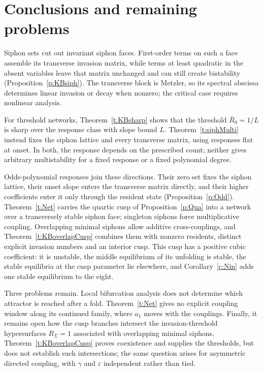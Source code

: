 \section{Conclusions and remaining problems}\label{s:concShort}

Siphon sets cut out invariant siphon faces. First-order terms on such a face
assemble its transverse invasion matrix, while terms at least quadratic in the
absent variables leave that matrix unchanged and can still create bistability
(Proposition~\ref{p:KBsiph}). The transverse block is Metzler, so its spectral
abscissa determines linear invasion or decay when nonzero; the critical case
requires nonlinear analysis.

For threshold networks, Theorem~\ref{t:KBsharp} shows that the threshold $\bar R_0=1/L$ is
sharp over the response class with slope bound $L$.
Theorem~\ref{t:siphMulti} instead fixes the siphon lattice and every transverse
matrix, using responses flat at onset. In both, the response depends on the
prescribed count; neither gives arbitrary multistability for a fixed response or
a fixed polynomial degree.

Odds-polynomial responses join these directions. Their zero set fixes the siphon
lattice, their onset slope enters the transverse matrix directly, and their higher
coefficients enter it only through the resident state (Proposition~\ref{p:Odd}).
Theorem~\ref{t:Net} carries the quartic cusp of Proposition~\ref{p:Qua} into a
network over a transversely stable siphon face; singleton siphons force
multiplicative coupling. Overlapping minimal siphons allow additive
cross-couplings, and Theorem~\ref{t:KBoverlapCusp} combines them with nonzero
residents, distinct explicit invasion numbers and an interior cusp. This cusp has
a positive cubic coefficient: it is unstable, the middle equilibrium of its
unfolding is stable, the stable equilibria at the cusp parameter lie elsewhere,
and Corollary~\ref{c:Nin} adds one stable equilibrium to the eight.

Three problems remain. Local bifurcation analysis does not determine which
attractor is reached after a fold. Theorem~\ref{t:Net} gives no explicit coupling
window along its continued family, where $a_1$ moves with the couplings. Finally,
it remains open how the cusp branches intersect the invasion-threshold
hypersurfaces $R_{\Sigma}=1$ associated with overlapping minimal siphons.
Theorem~\ref{t:KBoverlapCusp} proves coexistence and supplies the thresholds, but
does not establish such intersections; the same question arises for asymmetric
directed coupling, with $\gamma$ and $\varepsilon$ independent rather than tied.
